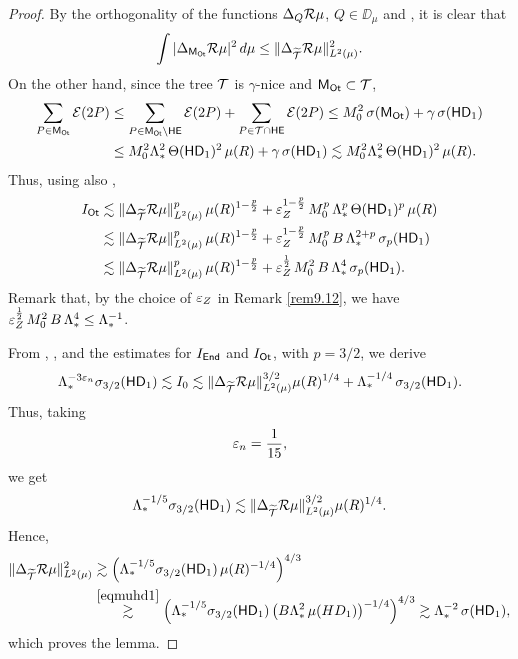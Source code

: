 \begin{proof}
By the orthogonality of the functions $\Delta_Q{\mathcal R}\mu$, $Q\in\DD_\mu$ and , it is clear that
$$\int |\Delta_{{\mathsf{M}}_{\mathsf{Ot}}}{\mathcal R}\mu|^2\,d\mu\leq \|\Delta_{{\widetilde{{\mathcal T}}}}{\mathcal R}\mu\|_{L^2(\mu)}^2.$$
On the other hand, since the tree ${\mathcal T}$ is $\gamma$-nice and ${\mathsf{M}}_{\mathsf{Ot}}\subset{\mathcal T}$,
\begin{align*}
\sum_{P\in{\mathsf{M}}_{{\mathsf{Ot}}}} {\mathcal E}(2P) & \leq \sum_{P\in{\mathsf{M}}_{{\mathsf{Ot}}}\setminus{\mathsf {HE}}} {\mathcal E}(2P) + \sum_{P\in {\mathcal T}\cap{\mathsf {HE}}} {\mathcal E}(2P)
\leq M_0^2\,\sigma({\mathsf{M}}_{{\mathsf{Ot}}}) + \gamma\,\sigma({\mathsf{HD}}_1)\\
&
\leq M_0^2\Lambda_*^2\,\Theta({\mathsf{HD}}_1)^2\,\mu(R)+ \gamma\,\sigma({\mathsf{HD}}_1)\lesssim M_0^2\Lambda_*^2\,\Theta({\mathsf{HD}}_1)^2\,\mu(R).
\end{align*}
Thus, using also ,
\begin{align*}
I_{\mathsf{Ot}} & \lesssim \|\Delta_{{\widetilde{{\mathcal T}}}}{\mathcal R}\mu\|_{L^2(\mu)}^p \,\mu(R)^{1-\frac p2}+ {\varepsilon}_Z^{1-\frac p2}\,M_0^p\,\Lambda_*^p\,\Theta({\mathsf{HD}}_1)^p\,\mu(R)\\
&
\lesssim \|\Delta_{{\widetilde{{\mathcal T}}}}{\mathcal R}\mu\|_{L^2(\mu)}^p \,\mu(R)^{1-\frac p2}+ {\varepsilon}_Z^{1-\frac p2}\,M_0^p\,B\,\Lambda_*^{2+p}\,\sigma_p({\mathsf{HD}}_1)\\
&\lesssim \|\Delta_{{\widetilde{{\mathcal T}}}}{\mathcal R}\mu\|_{L^2(\mu)}^p\, \mu(R)^{1-\frac p2}+ {\varepsilon}_Z^{\frac 12}\,M_0^2\,B\,\Lambda_*^{4}\,\sigma_p({\mathsf{HD}}_1).
\end{align*}
Remark that, by the choice of ${\varepsilon}_Z$ in Remark \ref{rem9.12}, we have ${\varepsilon}_Z^{\frac 12}\,M_0^2\,B\,\Lambda_*^{4}\leq \Lambda_*^{-1}$.
\vv

From , , and the estimates for $I_{\mathsf{End}}$ and $I_{\mathsf{Ot}}$, with $p=3/2$, we derive
$$\Lambda_*^{-3{\varepsilon}_n}\sigma_{3/2}({\mathsf{HD}}_1)\lesssim I_0 \lesssim
\|\Delta_{{\widetilde{{\mathcal T}}}}{\mathcal R}\mu\|_{L^2(\mu)}^{3/2} \mu(R)^{1/4}+ \Lambda_*^{{-1}/4}\,\sigma_{3/2}({\mathsf{HD}}_1).$$
Thus, taking
$${\varepsilon}_n=\frac1{15},$$
we get
$$\Lambda_*^{-1/5}\sigma_{3/2}({\mathsf{HD}}_1) \lesssim
\|\Delta_{{\widetilde{{\mathcal T}}}}{\mathcal R}\mu\|_{L^2(\mu)}^{3/2} \mu(R)^{1/4}.$$
Hence,
\begin{align*}
\|\Delta_{{\widetilde{{\mathcal T}}}}{\mathcal R}\mu\|_{L^2(\mu)}^2 &\gtrsim \Big(\Lambda_*^{-1/5}\sigma_{3/2}({\mathsf{HD}}_1)\,\mu(R)^{-1/4}\Big)^{4/3}\\
& \overset{\eqref{eqmuhd1}}{\gtrsim} \Big(\Lambda_*^{-1/5}\sigma_{3/2}({\mathsf{HD}}_1)\,\big(B\Lambda_*^2\,\mu(HD_1)\big)^{-1/4}\Big)^{4/3}
\gtrsim \Lambda_*^{-2}\,\sigma({\mathsf{HD}}_1),
\end{align*}
which proves the lemma.
\end{proof}



\vv
